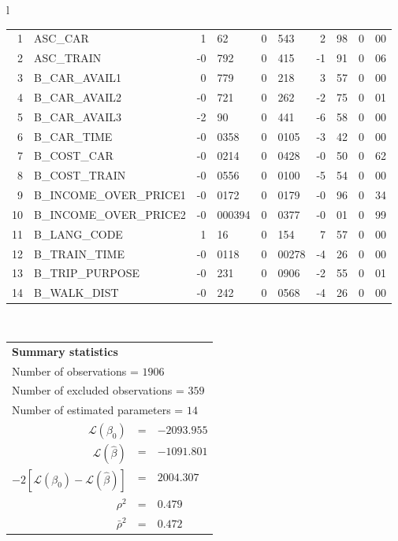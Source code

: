 \begin{tabular}{l}
\begin{tabular}{rlr@{.}lr@{.}lr@{.}lr@{.}l}
1 & ASC_CAR & 1&62 & 0&543 & 2&98 & 0&00\\
2 & ASC_TRAIN & -0&792 & 0&415 & -1&91 & 0&06\\
3 & B_CAR_AVAIL1 & 0&779 & 0&218 & 3&57 & 0&00\\
4 & B_CAR_AVAIL2 & -0&721 & 0&262 & -2&75 & 0&01\\
5 & B_CAR_AVAIL3 & -2&90 & 0&441 & -6&58 & 0&00\\
6 & B_CAR_TIME & -0&0358 & 0&0105 & -3&42 & 0&00\\
7 & B_COST_CAR & -0&0214 & 0&0428 & -0&50 & 0&62\\
8 & B_COST_TRAIN & -0&0556 & 0&0100 & -5&54 & 0&00\\
9 & B_INCOME_OVER_PRICE1 & -0&0172 & 0&0179 & -0&96 & 0&34\\
10 & B_INCOME_OVER_PRICE2 & -0&000394 & 0&0377 & -0&01 & 0&99\\
11 & B_LANG_CODE & 1&16 & 0&154 & 7&57 & 0&00\\
12 & B_TRAIN_TIME & -0&0118 & 0&00278 & -4&26 & 0&00\\
13 & B_TRIP_PURPOSE & -0&231 & 0&0906 & -2&55 & 0&01\\
14 & B_WALK_DIST & -0&242 & 0&0568 & -4&26 & 0&00\\
\hline
\end{tabular}
\\
\begin{tabular}{rcl}
\multicolumn{3}{l}{\bf Summary statistics}\\
\multicolumn{3}{l}{ Number of observations = $1906$} \\
\multicolumn{3}{l}{ Number of excluded observations = $359$} \\
\multicolumn{3}{l}{ Number of estimated  parameters = $14$} \\
 $\mathcal{L}(\beta_0)$ &=&  $-2093.955$ \\
 $\mathcal{L}(\hat{\beta})$ &=& $-1091.801 $  \\
 $-2[\mathcal{L}(\beta_0) -\mathcal{L}(\hat{\beta})]$ &=& $2004.307$ \\
    $\rho^2$ &=&   $0.479$ \\
    $\bar{\rho}^2$ &=&    $0.472$ \\
\end{tabular}
  \end{tabular}

